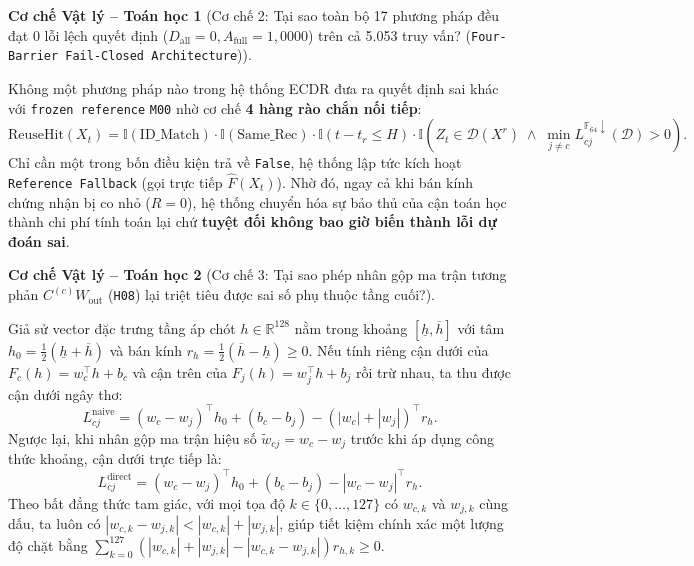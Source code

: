 \documentclass[11pt,a4paper]{article}
\newcommand{\R}{\mathbb{R}}
\newcommand{\F}{\mathbb{F}}
\newcommand{\abs}[1]{\left\lvert #1\right\rvert}
\newcommand{\code}[1]{{\small\ttfamily\nolinkurl{#1}}}
\newcommand{\Dset}{\mathcal{D}}
\newtheorem{mechanism}{Cơ chế Vật lý -- Toán học}[section]
\begin{document}
\begin{mechanism}[Cơ chế 2: Tại sao toàn bộ 17 phương pháp đều đạt $0$ lỗi lệch quyết định ($D_{\text{all}} = 0, A_{\text{full}} = 1,0000$) trên cả 5.053 truy vấn? (\code{Four-Barrier Fail-Closed Architecture})]
\end{mechanism}
Không một phương pháp nào trong hệ thống ECDR đưa ra quyết định sai khác với \code{frozen reference} \code{M00} nhờ cơ chế \textbf{4 hàng rào chắn nối tiếp}:
\begin{equation}
  \text{ReuseHit}(X_t) = \mathbb{I}(\text{ID\_Match}) \cdot \mathbb{I}(\text{Same\_Rec}) \cdot \mathbb{I}(t - t_r \le H) \cdot \mathbb{I}\!\left(Z_t \in \Dset(X^r) \;\land\; \min_{j \neq c} L_{cj}^{\F_{64}\downarrow}(\Dset) > 0\right).
\end{equation}
Chỉ cần một trong bốn điều kiện trả về \code{False}, hệ thống lập tức kích hoạt \code{Reference Fallback} (gọi trực tiếp $\widehat{F}(X_t)$). Nhờ đó, ngay cả khi bán kính chứng nhận bị co nhỏ ($R=0$), hệ thống chuyển hóa sự bảo thủ của cận toán học thành chi phí tính toán lại chứ \textbf{tuyệt đối không bao giờ biến thành lỗi dự đoán sai}.

\begin{mechanism}[Cơ chế 3: Tại sao phép nhân gộp ma trận tương phản $C^{(c)} W_{\text{out}}$ (\code{H08}) lại triệt tiêu được sai số phụ thuộc tầng cuối?]
\end{mechanism}
Giả sử vector đặc trưng tầng áp chót $h \in \R^{128}$ nằm trong khoảng $[\underline{h}, \overline{h}]$ với tâm $h_0 = \frac{1}{2}(\underline{h} + \overline{h})$ và bán kính $r_h = \frac{1}{2}(\overline{h} - \underline{h}) \ge 0$. Nếu tính riêng cận dưới của $F_c(h) = w_c^\top h + b_c$ và cận trên của $F_j(h) = w_j^\top h + b_j$ rồi trừ nhau, ta thu được cận dưới ngây thơ:
\begin{equation}
  L_{cj}^{\text{naive}} = (w_c - w_j)^\top h_0 + (b_c - b_j) - \left(\abs{w_c} + \abs{w_j}\right)^\top r_h.
\end{equation}
Ngược lại, khi nhân gộp ma trận hiệu số $\widetilde{w}_{cj} = w_c - w_j$ trước khi áp dụng công thức khoảng, cận dưới trực tiếp là:
\begin{equation}
  L_{cj}^{\text{direct}} = (w_c - w_j)^\top h_0 + (b_c - b_j) - \abs{w_c - w_j}^\top r_h.
\end{equation}
Theo bất đẳng thức tam giác, với mọi tọa độ $k \in \{0,\dots,127\}$ có $w_{c,k}$ và $w_{j,k}$ cùng dấu, ta luôn có $\abs{w_{c,k} - w_{j,k}} < \abs{w_{c,k}} + \abs{w_{j,k}}$, giúp tiết kiệm chính xác một lượng độ chặt bằng $\sum_{k=0}^{127} (\abs{w_{c,k}} + \abs{w_{j,k}} - \abs{w_{c,k} - w_{j,k}}) r_{h,k} \ge 0$.
\end{document}
